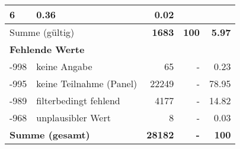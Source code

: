 \begin{longtable}{lXrrr}
       \num{6} &
       \num[round-mode=places,round-precision=2]{0.36} &
         \num[round-mode=places,round-precision=2]{0.02} \\
     \midrule
     \multicolumn{2}{l}{Summe (gültig)} &
       \textbf{\num{1683}} &
     \textbf{100} &
       \textbf{\num[round-mode=places,round-precision=2]{5.97}} \\
     \multicolumn{5}{l}{\textbf{Fehlende Werte}}\\
       -998 &
       keine Angabe &
         \num{65} &
        - &
         \num[round-mode=places,round-precision=2]{0.23} \\
       -995 &
       keine Teilnahme (Panel) &
         \num{22249} &
        - &
         \num[round-mode=places,round-precision=2]{78.95} \\
       -989 &
       filterbedingt fehlend &
         \num{4177} &
        - &
         \num[round-mode=places,round-precision=2]{14.82} \\
       -968 &
       unplausibler Wert &
         \num{8} &
        - &
         \num[round-mode=places,round-precision=2]{0.03} \\
     \midrule
     \multicolumn{2}{l}{\textbf{Summe (gesamt)}} &
          \textbf{\num{28182}} &
        \textbf{-} &
        \textbf{100} \\
     \bottomrule
     \end{longtable}
     
